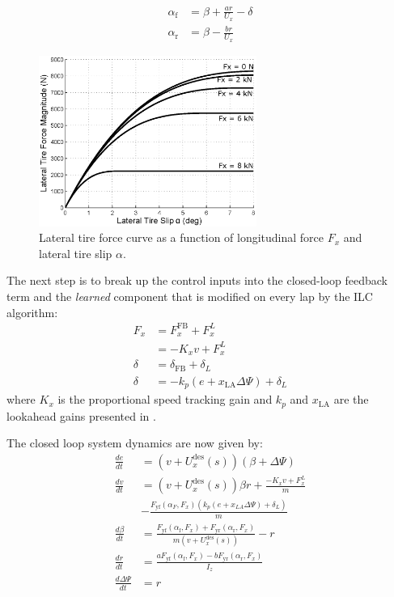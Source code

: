 \documentclass[9pt,shortpaper,twoside,web]{ieeecolor}
\begin{document}
{{{\begin{subequations}
\begin{align}
	\alpha_\mathrm{f} &= \beta + \frac{ar}{U_x} - \delta\\
	\alpha_\mathrm{r} &= \beta - \frac{br}{U_x}
\end{align}
\end{subequations}

\begin{figure}[tb]
\centering
\includegraphics[width=2.8in]{figures/tirecurves.eps}
\caption{Lateral tire force curve as a function of longitudinal force $F_x$ and lateral tire slip $\alpha$.}
\label{fig:coupledTires}
\end{figure} 

The next step is to break up the control inputs into the closed-loop feedback term and the \textit{learned} component that is
modified on every lap by the ILC algorithm:
\begin{align}
\label{eqn:splitTerms}
F_x &= F^{\mathrm{FB}}_x + F^L_x\\
    &= -K_xv + F^L_x\\
\delta &= \delta_{\mathrm{FB}} + \delta_L\\
\delta &= -k_p(e + x_\mathrm{LA}\Delta\Psi) + \delta_L
\end{align}
where $K_x$ is the proportional speed tracking gain and $k_p$ and $x_\mathrm{LA}$ are the lookahead gains presented in \cite{kapania}. 

The closed loop system dynamics are now given by: 
\begin{align}
\label{eq:fullNLCL}	
	\frac{de}{dt} &= \left(v+U^\mathrm{des}_x(s)\right)(\beta + \Delta\Psi) \\
	\frac{dv}{dt} &= \left(v+U^\mathrm{des}_x(s)\right)\beta r + \frac{-K_xv + F^L_x}{m} \\
	& - \frac{F_\mathrm{yf}(\alpha_F,F_x)(k_p(e + x_{LA}\Delta\Psi) + \delta_L)}{m}\\
	\frac{d\beta}{dt} &= \frac{F_\mathrm{yf}(\alpha_\mathrm{f}, F_x) + F_\mathrm{yr}(\alpha_\mathrm{r},F_x)}{m\left(v + U^\mathrm{des}_x(s)\right)} - r \\
	\frac{dr}{dt}     &= \frac{aF_\mathrm{yf}(\alpha_\mathrm{f}, F_x) - bF_\mathrm{yr}(\alpha_\mathrm{r}, F_x)}{I_z} \\
	\frac{d\Delta\Psi}{dt} &= r \label{eq:fullNLCL2}	
\end{align}

}}}
\end{document}
